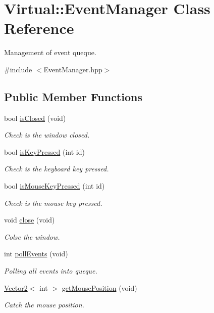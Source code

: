 \hypertarget{class_virtual_1_1_event_manager}{}\section{Virtual\+:\+:Event\+Manager Class Reference}
\label{class_virtual_1_1_event_manager}


Management of event queque.  




{\ttfamily \#include $<$Event\+Manager.\+hpp$>$}

\subsection*{Public Member Functions}
\begin{DoxyCompactItemize}
\item 
bool \hyperlink{class_virtual_1_1_event_manager_ab1f3521b16ff390d968a12c9c8fbc00c}{is\+Closed} (void)
\begin{DoxyCompactList}\small\item\em Check is the window closed. \end{DoxyCompactList}\item 
bool \hyperlink{class_virtual_1_1_event_manager_a565bd5f26862a9f8f102078df1cfa39c}{is\+Key\+Pressed} (int id)
\begin{DoxyCompactList}\small\item\em Check is the keyboard key pressed. \end{DoxyCompactList}\item 
bool \hyperlink{class_virtual_1_1_event_manager_addd617c04422d16843073acc9b8a6d32}{is\+Mouse\+Key\+Pressed} (int id)
\begin{DoxyCompactList}\small\item\em Check is the mouse key pressed. \end{DoxyCompactList}\item 
\hypertarget{class_virtual_1_1_event_manager_a994c1f4c3a9d5af2f7c64cf91900c884}{}\label{class_virtual_1_1_event_manager_a994c1f4c3a9d5af2f7c64cf91900c884} 
void \hyperlink{class_virtual_1_1_event_manager_a994c1f4c3a9d5af2f7c64cf91900c884}{close} (void)
\begin{DoxyCompactList}\small\item\em Colse the window. \end{DoxyCompactList}\item 
int \hyperlink{class_virtual_1_1_event_manager_a2e2394e7bb1ca6c7f2fc45813183d17a}{poll\+Events} (void)
\begin{DoxyCompactList}\small\item\em Polling all events into queque. \end{DoxyCompactList}\item 
\hyperlink{struct_virtual_1_1_vector2}{Vector2}$<$ int $>$ \hyperlink{class_virtual_1_1_event_manager_a3d55fffe71640c02b40788887a1048f0}{get\+Mouse\+Position} (void)
\begin{DoxyCompactList}\small\item\em Catch the mouse position. \end{DoxyCompactList}\end{DoxyCompactItemize}


